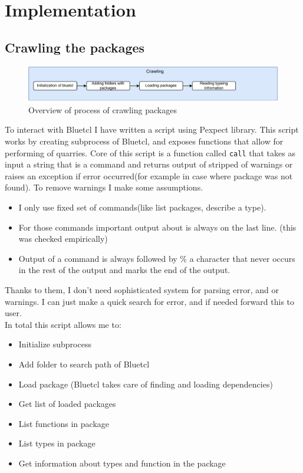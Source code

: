 \documentclass[12pt]{report}
\begin{document}
\chapter{Implementation}
\section{Crawling the packages}
\begin{figure}[!h]
    \centering
    \caption{Overview of process of crawling packages}

    \includegraphics[width=1.0\columnwidth]{pdfExports/LargeMap-Page-2.drawio.pdf}
\end{figure}
To interact with Bluetcl I have written a script using Pexpect library. This script works by creating subprocess of Bluetcl, and exposes functions that allow for performing of quarries. Core of this script is a function called \verb!call! that takes as input a string that is a command and returns output of stripped of warnings or raises an exception if error occurred(for example in case where package was not found). To remove warnings I make some assumptions.
\begin{itemize}
    \item I only use fixed set of commands(like list packages, describe a type).
    \item For those commands important output about is always on the last line. (this was checked empirically)
    \item Output of a command is always followed by $\%$ a character that never occurs in the rest of the output and marks the end of the output.
\end{itemize}
Thanks to them, I don't need sophisticated system for parsing error, and or warnings. I can just make a quick search for error, and if needed forward this to user.
\\ 
In total this script allows me to:
\begin{itemize}
    \item Initialize subprocess
    \item Add folder to search path of Bluetcl
    \item Load package (Bluetcl takes care of finding and loading dependencies)
    \item Get list of loaded packages
    \item List functions in package
    \item List types in package
    \item Get information about types and function in the package
\end{itemize}
\end{document}
